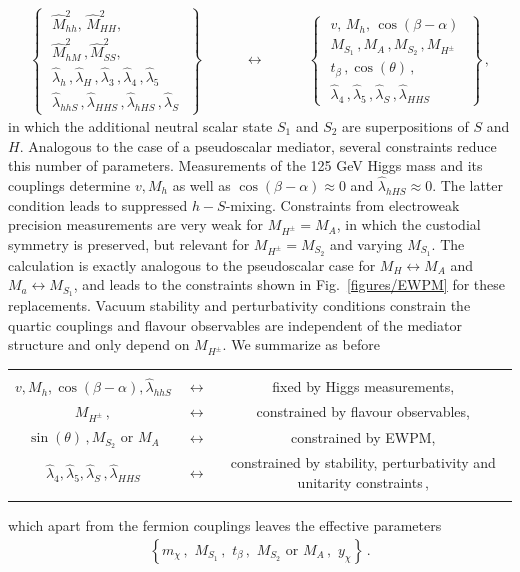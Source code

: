 \begin{align}
\left\{ \,\,\begin{matrix}
\hat M_{hh}^2,\,\hat M_{HH}^2,\\[3pt]
\hat M_{hM}^2\,, \hat M_{SS}^2,\\[3pt]
\hat\lambda_h\,,\hat\lambda_H\,,\hat\lambda_3\,,\hat\lambda_4\,,\hat \lambda_5\\
\hat \lambda_{hhS}\,,\hat \lambda_{HHS} \,, \hat\lambda_{hHS}\,,\hat\lambda_S
\end{matrix}\,\,\right\}\qquad \quad \longleftrightarrow \quad \qquad \left\{ \,\,\begin{matrix}
v,\, M_h,\,\cos(\beta-\alpha)\\[3pt]
M_{S_1}\,, M_A\,, M_{S_2}\,,M_{H^\pm}\\[3pt]
t_\beta\,, \cos(\theta)\,, \\[3pt]
\hat \lambda_4\,,\hat \lambda_{5}\,,\hat \lambda_{S}\,,\hat \lambda_{HHS}
\end{matrix}\,\,\right\}\,,
\end{align}
in which the additional neutral scalar state $S_1$ and $S_2$ are superpositions of $S$ and $H$.
Analogous to the case of a pseudoscalar mediator, several constraints reduce this number of parameters. Measurements of the 125 GeV Higgs mass and its couplings determine $v, M_h$ as well as $\cos(\beta-\alpha)\approx 0$ and $\hat \lambda_{hHS}\approx 0$. The latter condition leads to suppressed $h-S$-mixing. Constraints from electroweak precision measurements are very weak for $M_{H^\pm}=M_A$, in which the custodial symmetry is preserved, but relevant for $M_{H^\pm}=M_{S_2}$ and varying $M_{S_1}$. The calculation is exactly analogous to the pseudoscalar case for $M_H \leftrightarrow M_A$ and $M_a\leftrightarrow M_{S_1}$, and leads to the constraints shown in Fig.~\ref{figures/EWPM} for these replacements. Vacuum stability and perturbativity conditions constrain the quartic couplings and flavour observables are independent of the mediator structure and only depend on $M_{H^\pm}$. We summarize as before 
\newline
\begin{tabular}{cc c}
&&\\
$v, M_h, \cos(\beta-\alpha), \hat{\lambda}_{hhS} $&$\longleftrightarrow$& fixed by Higgs measurements,\\[.3cm]
$M_{H^\pm}\,, $  &$\longleftrightarrow $& constrained by flavour observables,\\[.3cm]
$\sin(\theta)\,, M_{S_2} \,\,\text{or} \,\,M_A$  &$\longleftrightarrow $& constrained by EWPM,\\[.3cm]
$\hat \lambda_4, \hat \lambda_{5}, \hat \lambda_{S}\,,\hat \lambda_{HHS} $ &$\longleftrightarrow $& constrained by stability, perturbativity and unitarity constraints\,,\\[.3cm]
&&
\end{tabular}
\newline
%
 which apart from the fermion couplings leaves the effective parameters
 \begin{align}
\left\{m_\chi\,,\,\, M_{S_1}\,,\,\, t_\beta\,,\,\, M_{S_2}\,\, \text{or}  \,\, M_{A}\,, \,\, y_\chi \right\}\,.
\end{align}

